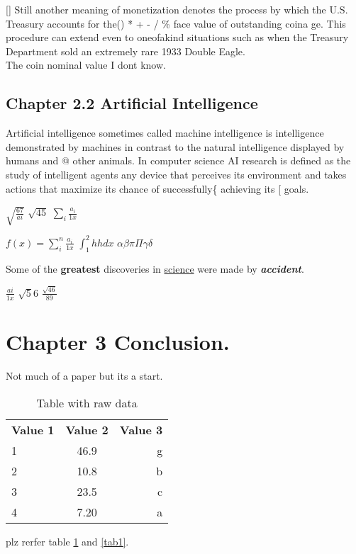 \documentclass{article}
\begin{document}
 [] Still another meaning of monetization denotes the process by which the U.S. Treasury accounts for the() * + - / \%  face value of outstanding coina ge. This procedure can extend even to oneofakind situations such as when the Treasury Department sold an extremely rare 1933 Double Eagle.\\ The coin nominal value I dont know.

\subsection{Chapter 2.2 Artificial Intelligence}

Artificial intelligence sometimes called machine intelligence is intelligence demonstrated by machines in contrast to the natural intelligence displayed by humans and @ other animals. In computer science AI research is defined as the study of intelligent agents any device that perceives its environment and takes actions that maximize its chance of successfully\{ achieving its [ goals.

$ \sqrt{\frac{67}{ai}} $
$ \sqrt{45}$
$ \sum_i \frac{a_i}{1x}  $

$ f(x) = \sum_{i}^{n} \frac{a_i}{1x} $
$ \int_{1}^{2} hh dx $
$ \alpha \beta \pi \Pi \gamma \delta $ 

Some of the \textbf{greatest}      
discoveries in     \underline{science}                 
were made by          \textbf{\textit{accident}}.

$ \frac{ai}{1x} $
$ \sqrt56$
$ \frac{\sqrt{46}}{89}$

\section{Chapter 3 Conclusion.}

Not much of a  paper but its a start.


\begin{table}
	\caption{Table with raw data}
	\label{tab2}
    \begin{tabular}{l|c|r}
      \textbf{Value 1} & \textbf{Value 2} & \textbf{Value 3} \\
      1 & 46.9 & g\\
      2 & 10.8 & b\\
      3 & 23.5 & c\\
      4 & 7.20 & a\\
\end{tabular}
 \end{table}

plz rerfer table \ref{tab2} and \ref{tab1}.
 
\end{document}
